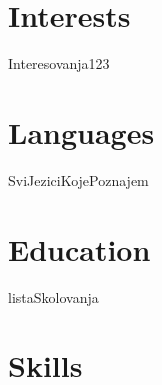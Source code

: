 \documentclass[letterpaper]{twentysecondcv} %
\begin{document}




\makeprofile %


\section{Interests}

Interesovanja123


\section{Languages}

SviJeziciKojePoznajem

\section{Education}

\begin{twenty} %
	listaSkolovanja
	
\end{twenty}


\section{Skills}

\begin{twentyshort} %
\end{twentyshort}
\end{document}
